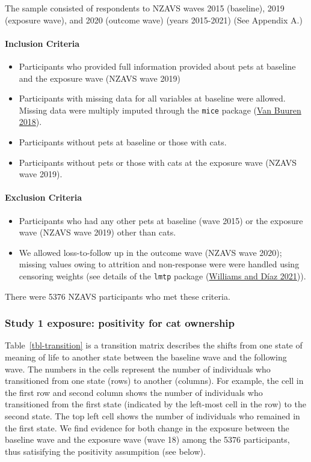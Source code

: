 \documentclass[
  singlecolumn,
  9pt]{article}
\let\oldparagraph\paragraph
\renewcommand{\paragraph}[1]{\oldparagraph{#1}\mbox{}}
\providecommand{\tightlist}{%
  \setlength{\itemsep}{0pt}\setlength{\parskip}{0pt}}\usepackage{longtable,booktabs,array}
\begin{document}
The sample consisted of respondents to NZAVS waves 2015 (baseline), 2019
(exposure wave), and 2020 (outcome wave) (years 2015-2021) (See Appendix
A.)

\paragraph{Inclusion Criteria}\label{inclusion-criteria}

\begin{itemize}
\tightlist
\item
  Participants who provided full information provided about pets at
  baseline and the exposure wave (NZAVS wave 2019)
\item
  Participants with missing data for all variables at baseline were
  allowed. Missing data were multiply imputed through the \texttt{mice}
  package (\hyperref[ref-vanbuuren2018]{Van Buuren 2018}).
\item
  Participants without pets at baseline or those with cats.
\item
  Participants without pets or those with cats at the exposure wave
  (NZAVS wave 2019).
\end{itemize}

\paragraph{Exclusion Criteria}\label{exclusion-criteria}

\begin{itemize}
\tightlist
\item
  Participants who had any other pets at baseline (wave 2015) or the
  exposure wave (NZAVS wave 2019) other than cats.
\item
  We allowed loss-to-follow up in the outcome wave (NZAVS wave 2020);
  missing values owing to attrition and non-response were were handled
  using censoring weights (see details of the \texttt{lmtp} package
  (\hyperref[ref-williams2021]{Williams and Díaz 2021})).
\end{itemize}

There were 5376 NZAVS participants who met these criteria.

\subsubsection{Study 1 exposure: positivity for cat
ownership}\label{study-1-exposure-positivity-for-cat-ownership}

Table~\ref{tbl-transition} is a transition matrix describes the shifts
from one state of meaning of life to another state between the baseline
wave and the following wave. The numbers in the cells represent the
number of individuals who transitioned from one state (rows) to another
(columns). For example, the cell in the first row and second column
shows the number of individuals who transitioned from the first state
(indicated by the left-most cell in the row) to the second state. The
top left cell shows the number of individuals who remained in the first
state. We find evidence for both change in the exposure between the
baseline wave and the exposure wave (wave 18) among the 5376
participants, thus satisifying the positivity assumpition (see below).
\end{document}
